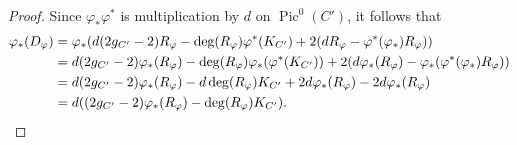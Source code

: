 \documentclass[10pt,a4paper]{amsart}
\DeclareMathOperator{\Pic}{Pic}
\begin{document}
\begin{proof} 
Since $\varphi_* \varphi^*$ is multiplication by $d$ on $\Pic^0(C')$, it follows that
\begin{align}\label{E:ShPush}
\begin{split}
\varphi_*(D_{\varphi}) &= \varphi_*(d (2g_{C'}-2)R_{\varphi}-\deg(R_{\varphi}) \varphi^{*}(K_{C'}) + 2(dR_{\varphi}-\varphi^{*}(\varphi_*)R_{\varphi})) \\
&=d (2g_{C'}-2) \varphi_*(R_{\varphi})-\deg(R_{\varphi}) \varphi_*(\varphi^{*}(K_{C'})) + 2(d \varphi_*(R_{\varphi})-\varphi_*(\varphi^{*}(\varphi_*)R_{\varphi})) \\
&= d (2g_{C'}-2) \varphi_*(R_{\varphi})-d\deg(R_{\varphi}) K_{C'} + 2d \varphi_*(R_{\varphi})-2d\varphi_*(R_{\varphi}) \\
&= d ((2g_{C'}-2) \varphi_*(R_{\varphi})-\deg(R_{\varphi}) K_{C'}).\qedhere
\end{split}
\end{align}
\end{proof}
\end{document}
